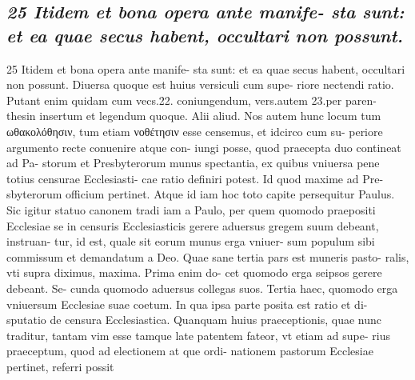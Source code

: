 \documentclass{article}
\begin{document}
\begin{pages}
\subsection*{\textit{25 Itidem et bona opera ante manife- sta sunt: et ea quae secus habent, occultari non possunt.}}25 Itidem et bona opera ante manife- sta sunt: et ea quae secus habent, occultari non possunt. Diuersa quoque est huius versiculi cum supe- riore nectendi ratio. Putant enim quidam cum vecs.22. coniungendum, vers.autem 23.per paren- thesin insertum et legendum quoque. Alii aliud. Nos autem hunc locum tum ωθακολόθησιν, tum etiam νοθέτησιν esse censemus, et idcirco cum su- periore argumento recte conuenire atque con- iungi posse, quod praecepta duo contineat ad Pa- storum et Presbyterorum munus spectantia, ex quibus vniuersa pene totius censurae Ecclesiasti- cae ratio definiri potest. Id quod maxime ad Pre- sbyterorum officium pertinet. Atque id iam hoc toto capite persequitur Paulus. Sic igitur statuo canonem tradi iam a Paulo, per quem quomodo praepositi Ecclesiae se in censuris Ecclesiasticis gerere aduersus gregem suum debeant, instruan- tur, id est, quale sit eorum munus erga vniuer- sum populum sibi commissum et demandatum a Deo. Quae sane tertia pars est muneris pasto- ralis, vti supra diximus, maxima. Prima enim do- cet quomodo erga seipsos gerere debeant. Se- cunda quomodo aduersus collegas suos. Tertia haec, quomodo erga vniuersum Ecclesiae suae coetum. In qua ipsa parte posita est ratio et di- sputatio de censura Ecclesiastica. Quanquam huius praeceptionis, quae nunc traditur, tantam vim esse tamque late patentem fateor, vt etiam ad supe- rius praeceptum, quod ad electionem at que ordi- nationem pastorum Ecclesiae pertinet, referri possit  \pend

\end{pages}
\end{document}
